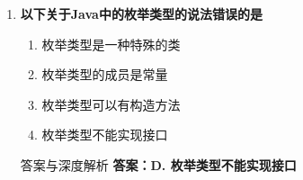 \documentclass[12pt, a4paper]{ctexart}
\begin{document}
\begin{enumerate}[label=\textbf{\arabic*.}]
	      \begin{bluebox}{答案与深度解析}
		      \textbf{答案：A. parseDouble()}

		      \textbf{【选项原理深度拆解】}
					  \begin{itemize}[label={}, leftmargin=*, nosep]


		      \item \textbf{A. parseDouble() — 正确}
					  \begin{itemize}[label={}, nosep]
		      
			      \item Double.parseDouble(String s) 返回double基本类型

					  \end{itemize}
		      \item \textbf{B. valueOf() — 错误}
					  \begin{itemize}[label={}, nosep]
		      
			      \item Double.valueOf(String s) 返回Double对象
		      

					  \end{itemize}
		      \item \textbf{C/D — 错误}
					  \begin{itemize}[label={}, nosep]
		      
			      \item 这些方法不是Double类的转换方法
		      
		      

	      
					  \end{itemize}
					  \end{itemize}
\end{bluebox}

	      \vspace{1em}

	\item \textbf{以下关于Java中的枚举类型的说法错误的是}
	      \begin{enumerate}[label=\Alph*.]
		      \item 枚举类型是一种特殊的类
		      \item 枚举类型的成员是常量
		      \item 枚举类型可以有构造方法
		      \item 枚举类型不能实现接口
	      \end{enumerate}

	      \begin{bluebox}{答案与深度解析}
		      \textbf{答案：D. 枚举类型不能实现接口}


\end{bluebox}
\end{enumerate}
\end{document}
